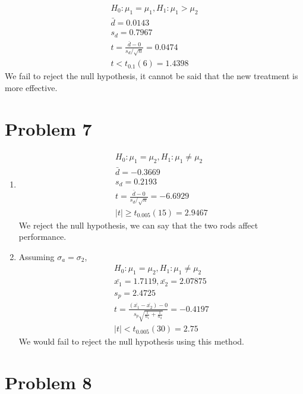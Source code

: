 \documentclass{article}
\begin{document}
\begin{gather*}
	H_0: \mu_1 = \mu_1, H_1: \mu_1 > \mu_2 \\
	\bar{d} = 0.0143 \\
	s_d = 0.7967 \\
	t = \frac{\bar{d}-0}{s_d / \sqrt{n}} = 0.0474 \\
	t < t_{0.1}(6) = 1.4398
\end{gather*}
We fail to reject the null hypothesis, it cannot be said that the new treatment
is more effective.

\section*{Problem 7}

\begin{enumerate}
	\item
		\begin{gather*}
			H_0: \mu_1 = \mu_2, H_1: \mu_1 \ne \mu_2 \\
			\bar{d} = -0.3669 \\
			s_d = 0.2193 \\
			t = \frac{\bar{d} - 0}{s_d / \sqrt{n}} = -6.6929 \\
			|t| \ge t_{0.005}(15) = 2.9467
		\end{gather*}
		We reject the null hypothesis, we can say that the two rods
		affect performance.
	\item
		Assuming $\sigma_a = \sigma_2$,
		\begin{gather*}
			H_0: \mu_1 = \mu_2, H_1: \mu_1 \ne \mu_2 \\
			\bar{x_1} = 1.7119, \bar{x_2} = 2.07875 \\
			s_p = 2.4725 \\
			t = \frac{(\bar{x_1} - \bar{x_2}) - 0}{s_p\sqrt{\frac{1}{n_1} + \frac{1}{n_2}}}
			= -0.4197 \\
			|t| < t_{0.005}(30) = 2.75
		\end{gather*}
		We would fail to reject the null hypothesis using this method.
\end{enumerate}

\section*{Problem 8}
\end{document}
